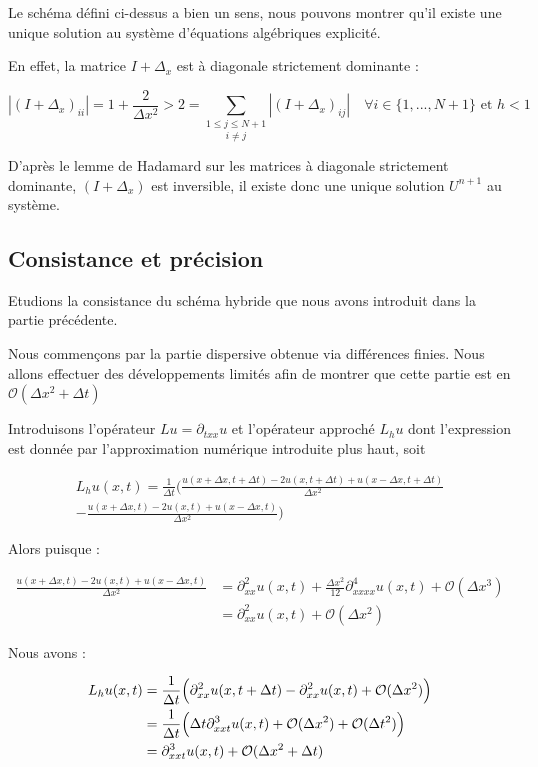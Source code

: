 \vspace{1em}
Le schéma défini ci-dessus a bien un sens, nous pouvons montrer qu'il existe une unique solution au système d'équations algébriques explicité.

En effet, la matrice $I + \Delta_x$ est à diagonale strictement dominante :

$$|(I + \Delta_x)_{ii}| = 1 + \frac{2}{\Delta x^2} > 2 = \underset{i \neq j}{\sum_{1\leq j \leq N+1}} |(I + \Delta_x)_{ij}| \quad \forall i \in \{1,...,N+1\} \text{ et } h<1$$

D'après le lemme de Hadamard sur les matrices à diagonale strictement dominante, $(I + \Delta_x)$ est inversible, il existe donc une unique solution $U^{n+1}$ au système.


\subsection{Consistance et précision}

Etudions la consistance du schéma hybride que nous avons introduit dans la partie précédente.

Nous commençons par la partie dispersive obtenue via différences finies. Nous allons effectuer des développements limités afin de montrer que cette partie est en $\mathcal{O}(\Delta x^2 + \Delta t)$

Introduisons l'opérateur $Lu = \partial_{txx}u$ et l'opérateur approché $L_hu$ dont l'expression est donnée par l'approximation numérique introduite plus haut, soit 

\begin{align*}
    L_hu(x,t) = \frac{1}{\Delta t} \Biggl( \frac{u(x+ \Delta x, t + \Delta t) - 2u(x,t + \Delta t) + u(x- \Delta x,t + \Delta t)}{\Delta x^2}\\ 
    - \frac{u(x+\Delta x,t) - 2u(x,t) + u(x-\Delta x, t)}{\Delta x^2} \Biggr)
\end{align*}

Alors puisque :

\begin{align*}
    \frac{u(x+\Delta x,t) - 2u(x,t) + u(x-\Delta x,t)}{\Delta x^2} &= \partial_{xx}^2u(x,t) + \frac{\Delta x^2}{12}\partial_{xxxx}^4u(x,t) + \mathcal{O}(\Delta x^3) \\
    &= \partial_{xx}^2u(x,t) + \mathcal{O}(\Delta x ^2) 
\end{align*}

Nous avons :

\begin{equation*}
\begin{split}
    L_hu(x,t) &= \frac{1}{\Delta t}\Bigl( \partial_{xx}^2u(x,t+\Delta t) - \partial_{xx}^2u(x,t) + \mathcal{O}(\Delta x^2) \Bigr) \\
    &= \frac{1}{\Delta t} \Bigl( \Delta t \partial_{xxt}^3 u(x,t) + \mathcal{O}(\Delta x^2) + \mathcal{O}(\Delta t^2) \Bigr)\\
    &= \partial_{xxt}^3u(x,t) + \mathcal{O}(\Delta x^2 + \Delta t)
\end{split}
\end{equation*}

